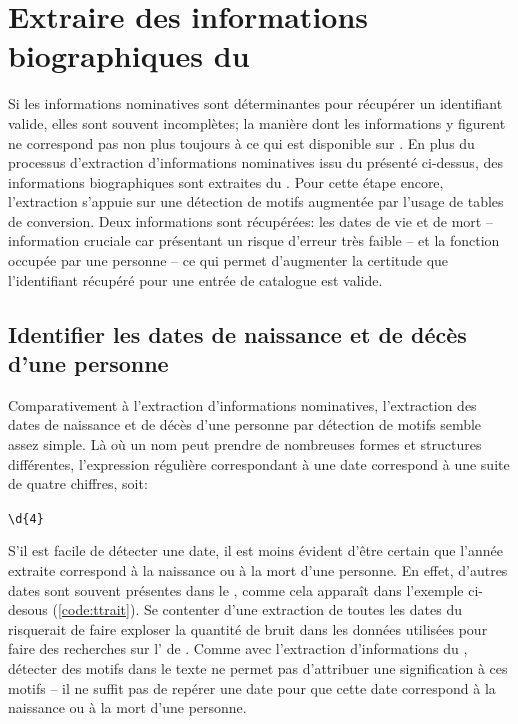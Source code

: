\section{Extraire des informations biographiques du \ttrait{}}
Si les informations nominatives sont déterminantes pour récupérer un identifiant valide, elles sont souvent incomplètes; la manière dont les informations y figurent ne correspond pas non plus toujours à ce qui est disponible sur \wkd{}. En plus du processus d'extraction d'informations nominatives issu du \tname{} présenté ci-dessus, des informations biographiques sont extraites du \ttrait{}. Pour cette étape encore, l'extraction s'appuie sur une détection de motifs augmentée par l'usage de tables de conversion. Deux informations sont récupérées: les dates de vie et de mort -- information cruciale car présentant un risque d'erreur très faible -- et la fonction occupée par une personne -- ce qui permet d'augmenter la certitude que l'identifiant \wkd{} récupéré pour une entrée de catalogue est valide.

\subsection{Identifier les dates de naissance et de décès d'une personne}
Comparativement à l'extraction d'informations nominatives, l'extraction des dates de naissance et de décès d'une personne par détection de motifs semble assez simple. Là où un nom peut prendre de nombreuses formes et structures différentes, l'\gls{expression régulière} correspondant à une date correspond à une suite de quatre chiffres, soit:

\begin{center}
	\texttt{\textbackslash{}d\{4\}}
\end{center}

S'il est facile de détecter une date, il est moins évident d'être certain que l'année extraite correspond à la naissance ou à la mort d'une personne. En effet, d'autres dates sont souvent présentes dans le \ttrait{}, comme cela apparaît dans l'exemple ci-desous (\ref{code:ttrait}). Se contenter d'une extraction de toutes les dates du \ttrait{} risquerait de faire exploser la quantité de bruit dans les données utilisées pour faire des recherches sur l'\api{} de \wkd{}. Comme avec l'extraction d'informations du \tname{}, détecter des motifs dans le texte ne permet pas d'attribuer une signification à ces motifs -- il ne suffit pas de repérer une date pour que cette date correspond à la naissance ou à la mort d'une personne.

